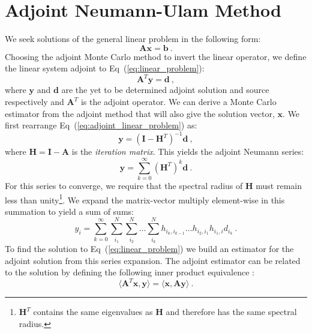 \documentclass[preprint,11pt]{elsarticle}
\newcommand{\ve}[1]{\ensuremath{\mathbf{#1}}}
\begin{document}
\section{Adjoint Neumann-Ulam Method}
\label{sec:adjoint_nu}

We seek solutions of the general linear problem in the following form:
\begin{equation}
  \ve{A} \ve{x} = \ve{b}\:.
  \label{eq:linear_problem}
\end{equation}
Choosing the adjoint Monte Carlo method to invert the linear operator, we
define the linear system adjoint to Eq~(\ref{eq:linear_problem}):
\begin{equation}
  \ve{A}^T \ve{y} = \ve{d}\:,
  \label{eq:adjoint_linear_problem}
\end{equation}
where $\ve{y}$ and $\ve{d}$ are the yet to be determined adjoint solution and
source respectively and $\ve{A}^T$ is the adjoint operator. We can derive a
Monte Carlo estimator from the adjoint method that will also give the solution
vector, $\ve{x}$. We first rearrange Eq~(\ref{eq:adjoint_linear_problem}) as:
\begin{equation}
  \ve{y} = (\ve{I} - \ve{H}^T)^{-1} \ve{d}\:,
  \label{eq:adjoint_split_system_2}
\end{equation}
where $\ve{H} = \ve{I} - \ve{A}$ is the \textit{iteration matrix}.
This yields the adjoint Neumann series:
\begin{equation}
  \ve{y} = \sum_{k=0}^{\infty} (\ve{H}^T)^k\ve{d}\:.
  \label{eq:adjoint_neumann_series}
\end{equation}
For this series to converge, we require that the spectral radius of $\ve{H}$
must remain less than unity\footnote{$\ve{H}^T$ contains the same eigenvalues
  as $\ve{H}$ and therefore has the same spectral radius.}. We expand the
matrix-vector multiply element-wise in this summation to yield a sum of sums:
\begin{equation}
  y_i = \sum_{k=0}^{\infty}\sum_{i_1}^{N}\sum_{i_2}^{N}\ldots
  \sum_{i_k}^{N}h_{i_k,i_{k-1}}\ldots h_{i_2,i_1} h_{i_1,i} d_{i_k}\:.
  \label{eq:adjoint_neumann_solution}
\end{equation}
To find the solution to Eq~(\ref{eq:linear_problem}) we build an
estimator for the adjoint solution from this series expansion. The
adjoint estimator can be related to the solution by defining the
following inner product equivalence \cite{spanier_monte_1969}:
\begin{equation}
  \langle \ve{A}^T \ve{x}, \ve{y} \rangle = \langle \ve{x}, \ve{A}
  \ve{y} \rangle\:.
  \label{eq:adjoint_operator_product}
\end{equation}
\end{document}
